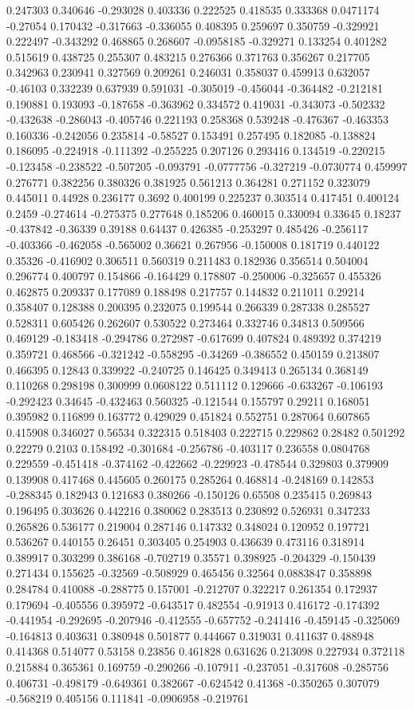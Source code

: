 0.247303 0.340646 -0.293028 0.403336 0.222525 0.418535 0.333368 0.0471174 -0.27054 0.170432 -0.317663 -0.336055 0.408395 0.259697 0.350759 -0.329921 0.222497 -0.343292 0.468865 0.268607 -0.0958185 -0.329271 0.133254 0.401282 0.515619 0.438725 0.255307 0.483215 0.276366 0.371763 0.356267 0.217705 0.342963 0.230941 0.327569 0.209261 0.246031 0.358037 0.459913 0.632057 -0.46103 0.332239 0.637939 0.591031 -0.305019 -0.456044 -0.364482 -0.212181 0.190881 0.193093 -0.187658 -0.363962 0.334572 0.419031 -0.343073 -0.502332 -0.432638 -0.286043 -0.405746 0.221193 0.258368 0.539248 -0.476367 -0.463353 0.160336 -0.242056 0.235814 -0.58527 0.153491 0.257495 0.182085 -0.138824 0.186095 -0.224918 -0.111392 -0.255225 0.207126 0.293416 0.134519 -0.220215 -0.123458 -0.238522 -0.507205 -0.093791 -0.0777756 -0.327219 -0.0730774 0.459997 0.276771 0.382256 0.380326 0.381925 0.561213 0.364281 0.271152 0.323079 0.445011 0.44928 0.236177 0.3692 0.400199 0.225237 0.303514 0.417451 0.400124 0.2459 -0.274614 -0.275375 0.277648 0.185206 0.460015 0.330094 0.33645 0.18237 -0.437842 -0.36339 0.39188 0.64437 0.426385 -0.253297 0.485426 -0.256117 -0.403366 -0.462058 -0.565002 0.36621 0.267956 -0.150008 0.181719 0.440122 0.35326 -0.416902 0.306511 0.560319 0.211483 0.182936 0.356514 0.504004 0.296774 0.400797 0.154866 -0.164429 0.178807 -0.250006 -0.325657 0.455326 0.462875 0.209337 0.177089 0.188498 0.217757 0.144832 0.211011 0.29214 0.358407 0.128388 0.200395 0.232075 0.199544 0.266339 0.287338 0.285527 0.528311 0.605426 0.262607 0.530522 0.273464 0.332746 0.34813 0.509566 0.469129 -0.183418 -0.294786 0.272987 -0.617699 0.407824 0.489392 0.374219 0.359721 0.468566 -0.321242 -0.558295 -0.34269 -0.386552 0.450159 0.213807 0.466395 0.12843 0.339922 -0.240725 0.146425 0.349413 0.265134 0.368149 0.110268 0.298198 0.300999 0.0608122 0.511112 0.129666 -0.633267 -0.106193 -0.292423 0.34645 -0.432463 0.560325 -0.121544 0.155797 0.29211 0.168051 0.395982 0.116899 0.163772 0.429029 0.451824 0.552751 0.287064 0.607865 0.415908 0.346027 0.56534 0.322315 0.518403 0.222715 0.229862 0.28482 0.501292 0.22279 0.2103 0.158492 -0.301684 -0.256786 -0.403117 0.236558 0.0804768 0.229559 -0.451418 -0.374162 -0.422662 -0.229923 -0.478544 0.329803 0.379909 0.139908 0.417468 0.445605 0.260175 0.285264 0.468814 -0.248169 0.142853 -0.288345 0.182943 0.121683 0.380266 -0.150126 0.65508 0.235415 0.269843 0.196495 0.303626 0.442216 0.380062 0.283513 0.230892 0.526931 0.347233 0.265826 0.536177 0.219004 0.287146 0.147332 0.348024 0.120952 0.197721 0.536267 0.440155 0.26451 0.303405 0.254903 0.436639 0.473116 0.318914 0.389917 0.303299 0.386168 -0.702719 0.35571 0.398925 -0.204329 -0.150439 0.271434 0.155625 -0.32569 -0.508929 0.465456 0.32564 0.0883847 0.358898 0.284784 0.410088 -0.288775 0.157001 -0.212707 0.322217 0.261354 0.172937 0.179694 -0.405556 0.395972 -0.643517 0.482554 -0.91913 0.416172 -0.174392 -0.441954 -0.292695 -0.207946 -0.412555 -0.657752 -0.241416 -0.459145 -0.325069 -0.164813 0.403631 0.380948 0.501877 0.444667 0.319031 0.411637 0.488948 0.414368 0.514077 0.53158 0.23856 0.461828 0.631626 0.213098 0.227934 0.372118 0.215884 0.365361 0.169759 -0.290266 -0.107911 -0.237051 -0.317608 -0.285756 0.406731 -0.498179 -0.649361 0.382667 -0.624542 0.41368 -0.350265 0.307079 -0.568219 0.405156 0.111841 -0.0906958 -0.219761 